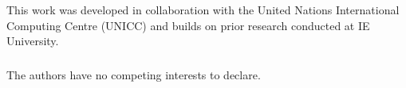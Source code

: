 \documentclass[runningheads]{llncs}
\begin{document}
\begin{credits}
\subsubsection{\ackname}
This work was developed in collaboration with the United Nations International
Computing Centre (UNICC) and builds on prior research conducted at IE University.

\subsubsection{\discintname}
The authors have no competing interests to declare.
\end{credits}

\end{document}
